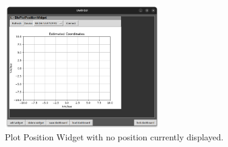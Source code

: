 \begin{figure}[!hbt]
	\centering
	\includegraphics[width=0.6\textwidth]{pictures/coordinate_plot.png}
	\caption{Plot Position Widget with no position currently displayed.}
	\label{fig:coordinate_plot}
\end{figure}
